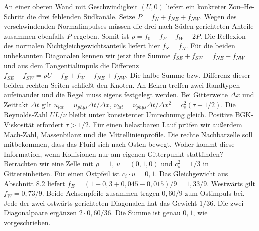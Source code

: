 An einer oberen Wand mit Geschwindigkeit \((U,0)\) liefert ein konkreter Zou–He-Schritt die drei fehlenden Südkanäle. Setze \(P=f_N+f_{NE}+f_{NW}\). Wegen des verschwindenden Normalimpulses müssen die drei nach Süden gerichteten Anteile zusammen ebenfalls \(P\) ergeben. Somit ist \(\rho=f_0+f_E+f_W+2P\). Die Reflexion des normalen Nichtgleichgewichtsanteils liefert hier \(f_S=f_N\). Für die beiden unbekannten Diagonalen kennen wir jetzt ihre Summe \(f_{SE}+f_{SW}=f_{NE}+f_{NW}\) und aus dem Tangentialimpuls die Differenz \(f_{SE}-f_{SW}=\rho U-f_E+f_W-f_{NE}+f_{NW}\). Die halbe Summe bzw. Differenz dieser beiden rechten Seiten schließt den Knoten. An Ecken treffen zwei Randtypen aufeinander und die Regel muss eigens festgelegt werden.
\hypertarget{punkt8-4-3}{}
Bei Gitterweite \(\Delta x\) und Zeittakt \(\Delta t\) gilt \(u_{lat}=u_{phys}\Delta t/\Delta x\), \(\nu_{lat}=\nu_{phys}\Delta t/\Delta x^2=c_s^2(\tau-1/2)\). Die Reynolds-Zahl \(UL/\nu\) bleibt unter konsistenter Umrechnung gleich. Positive BGK-Viskosität erfordert \(\tau>1/2\). Für einen belastbaren Lauf prüfen wir außerdem Mach-Zahl, Massenbilanz und die Mittellinienprofile.
Die rechte Nachbarzelle soll mitbekommen, dass das Fluid sich nach Osten bewegt. Woher kommt diese Information, wenn Kollisionen nur am eigenen Gitterpunkt stattfinden? Betrachten wir eine Zelle mit \(\rho=1\), \(u=(0{,}1,0)\) und \(c_s^2=1/3\) in Gittereinheiten. Für einen Ostpfeil ist \(c_i\cdot u=0{,}1\). Das Gleichgewicht aus Abschnitt 8.2 liefert \(f_E=(1+0{,}3+0{,}045-0{,}015)/9=1{,}33/9\). Westwärts gilt \(f_W=0{,}73/9\). Beide Achsenpfeile zusammen tragen \(0{,}60/9\) zum Ostimpuls bei. Jede der zwei ostwärts gerichteten Diagonalen hat das Gewicht \(1/36\). Die zwei Diagonalpaare ergänzen \(2\cdot0{,}60/36\). Die Summe ist genau \(0{,}1\), wie vorgeschrieben.


